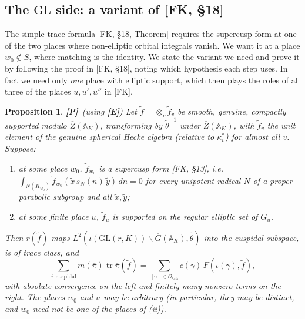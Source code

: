 \documentclass[12pt]{article}
\newcommand{\ov}[1]{\overline{#1}}
\newcommand{\A}{\mathbb{A}}
\newcommand{\tr}{\operatorname{tr}}
\newcommand{\GL}{\mathrm{GL}}
\newcommand{\Gb}{\ov{G}}
\newcommand{\Zb}{\ov{Z}}
\newcommand{\pib}{\ov{\pi}}
\newcommand{\ks}{\kappa^{*}}
\newcommand{\Pv}{\textbf{[P]}}
\newcommand{\Ev}{\textbf{[E]}}
\theoremstyle{plain}
\newtheorem{proposition}[theorem]{Proposition}
\theoremstyle{definition}
\begin{document}
\subsection{The $\GL$ side: a variant of [FK, \S18]}\label{subsec:TFGL}
The simple trace formula [FK, \S18, Theorem] requires the supercusp form at one of the two places where non-elliptic orbital integrals vanish. We want it at a place $w_0\notin S$, where matching is the identity. We state the variant we need and prove it by following the proof in [FK, \S18], noting which hypothesis each step uses. In fact we need only \emph{one} place with elliptic support, which then plays the roles of all three of the places $u,u',u''$ in [FK].

\begin{proposition}\label{prop:FKvariant}\Pv\ (using \Ev)
Let $\tilde f=\otimes_v\tilde f_v$ be smooth, genuine, compactly supported modulo $\Zb(\A_K)$, transforming by $\tilde\theta^{-1}$ under $\Zb(\A_K)$, with $\tilde f_v$ the unit element of the genuine spherical Hecke algebra (relative to $\ks_v$) for almost all $v$. Suppose:
\begin{enumerate}[label=(\roman*)]
\item at some place $w_0$, $\tilde f_{w_0}$ is a supercusp form [FK, \S13], i.e.\ $\int_{N(K_{w_0})}\tilde f_{w_0}(\tilde x\,s_N(n)\,\tilde y)\,dn=0$ for every unipotent radical $N$ of a proper parabolic subgroup and all $\tilde x,\tilde y$;
\item at some finite place $u$, $\tilde f_u$ is supported on the regular elliptic set of $\Gb_u$.
\end{enumerate}
Then $r(\tilde f)$ maps $L^2(\iota(\GL(r,K))\backslash\Gb(\A_K),\tilde\theta)$ into the cuspidal subspace, is of trace class, and
\[ \sum_{\pib\ \mathrm{cuspidal}}m(\pib)\tr\pib(\tilde f)=\sum_{[\gamma]\in\mathcal O_{\GL}}c(\gamma)\,F(\iota(\gamma),\tilde f), \]
with absolute convergence on the left and finitely many nonzero terms on the right. The places $w_0$ and $u$ may be arbitrary (in particular, they may be distinct, and $w_0$ need not be one of the places of (ii)).
\end{proposition}
\end{document}
